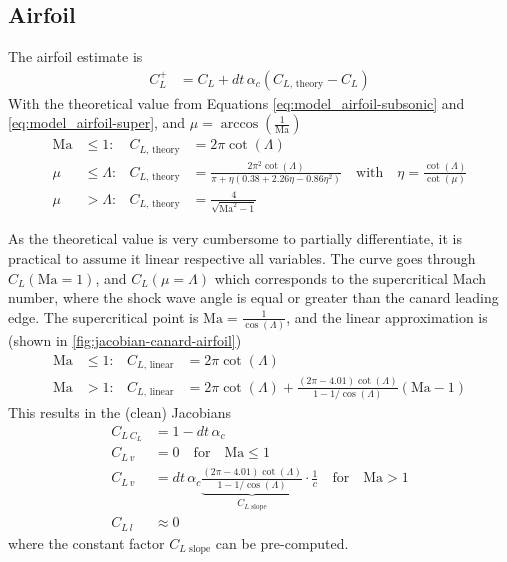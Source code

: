 \subsection{Airfoil}
\label{sec:jacobians-airfoil}
The airfoil estimate  is
\begin{align}
    C_L^+ &= C_L + dt \, \alpha_c (C_{L\text{, theory}} - C_L) \label{eq:jacobian-cl-update}
\end{align}
With the theoretical value from Equations \ref{eq:model_airfoil-subsonic} and \ref{eq:model_airfoil-super}, and $\mu = \arccos(\frac{1}{\mathrm{Ma}})$
\begin{align}
    \mathrm{Ma} &\leq  1: & C_{L\text{, theory}} &= 2 \pi\cot(\Lambda)
    \\
    \mu &\leq \Lambda : & C_{L\text{, theory}} &= \frac{2 \pi^2 \cot(\Lambda)}{\pi + \eta (0.38 + 2.26 \eta - 0.86 \eta^2)} \quad \text{with} \quad \eta = \frac{\cot(\Lambda)}{\cot(\mu)} 
    \\
    \mu &> \Lambda : &C_{L\text{, theory}} &= \frac{4}{\sqrt{\mathrm{Ma}^2-1}}
\end{align}

As the theoretical value is very cumbersome to partially differentiate, it is practical to assume it linear respective all variables. 
The curve goes through $C_L(\mathrm{Ma}=1)$, and $C_L(\mu = \Lambda)$ which corresponds to the supercritical Mach number, where the shock wave angle is equal or greater than the canard leading edge.
The supercritical point is $\mathrm{Ma} = \frac{1}{\cos(\Lambda)}$, and the linear approximation is (shown in \autoref{fig:jacobian-canard-airfoil})
\begin{align}
    \mathrm{Ma} &\leq  1: & C_{L\text{, linear}} &= 2 \pi\cot(\Lambda)
    \\
    \mathrm{Ma} &>  1: & C_{L\text{, linear}} &= 2 \pi\cot(\Lambda) + \frac{(2 \pi - 4.01) \cot(\Lambda)}{1 - 1/\cos(\Lambda)} (\mathrm{Ma}-1)
\end{align}
This results in the (clean) Jacobians
\begin{align}
    C_{L \, C_L} &= 1 - dt \, \alpha_c
    \\
    C_{L \, v} &= 0 \quad\text{for}\quad \mathrm{Ma}\leq 1
    \\
    C_{L \, v} &=  dt \, \alpha_c  
    \underbrace{\frac{(2 \pi - 4.01) \cot(\Lambda)}{1 - 1/\cos(\Lambda)}}_{C_{L \text{ slope}}} \cdot \frac{1}{c}
    \quad\text{for}\quad \mathrm{Ma}> 1
    \\
    C_{L \, l} &\approx 0
\end{align}
where the constant factor $C_{L \text{ slope}}$ can be pre-computed.


